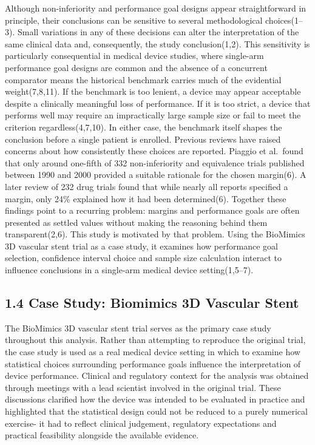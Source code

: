 \documentclass{article}
\begin{document}
Although non-inferiority and performance goal designs appear
straightforward in principle, their conclusions can be sensitive to
several methodological choices(1--3). Small variations in any of these
decisions can alter the interpretation of the same clinical data and,
consequently, the study conclusion(1,2). This sensitivity is
particularly consequential in medical device studies, where single-arm
performance goal designs are common and the absence of a concurrent
comparator means the historical benchmark carries much of the evidential
weight(7,8,11). If the benchmark is too lenient, a device may appear
acceptable despite a clinically meaningful loss of performance. If it is
too strict, a device that performs well may require an impractically
large sample size or fail to meet the criterion regardless(4,7,10). In
either case, the benchmark itself shapes the conclusion before a single
patient is enrolled. Previous reviews have raised concerns about how
consistently these choices are reported. Piaggio et al.~found that only
around one-fifth of 332 non-inferiority and equivalence trials published
between 1990 and 2000 provided a suitable rationale for the chosen
margin(6). A later review of 232 drug trials found that while nearly all
reports specified a margin, only 24\% explained how it had been
determined(6). Together these findings point to a recurring problem:
margins and performance goals are often presented as settled values
without making the reasoning behind them transparent(2,6). This study is
motivated by that problem. Using the BioMimics 3D vascular stent trial
as a case study, it examines how performance goal selection, confidence
interval choice and sample size calculation interact to influence
conclusions in a single-arm medical device setting(1,5--7).

\subsection{1.4 Case Study: Biomimics 3D Vascular
Stent}\label{case-study-biomimics-3d-vascular-stent}

The BioMimics 3D vascular stent trial serves as the primary case study
throughout this analysis. Rather than attempting to reproduce the
original trial, the case study is used as a real medical device setting
in which to examine how statistical choices surrounding performance
goals influence the interpretation of device performance. Clinical and
regulatory context for the analysis was obtained through meetings with a
lead scientist involved in the original trial. These discussions
clarified how the device was intended to be evaluated in practice and
highlighted that the statistical design could not be reduced to a purely
numerical exercise- it had to reflect clinical judgement, regulatory
expectations and practical feasibility alongside the available evidence.
\end{document}
